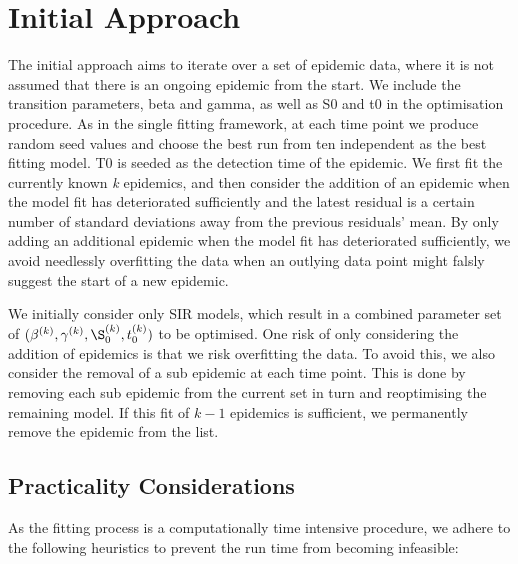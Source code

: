 \section{Initial Approach}
The initial approach aims to iterate over a set of epidemic data,
where it is not assumed that there is an ongoing epidemic from the
start. We include the transition parameters, beta and gamma, as well
as S0 and t0 in the optimisation procedure. As in the single fitting
framework, at each time point we produce random seed values and choose
the best run from ten independent as the best fitting model. T0 is
seeded as the detection time of the epidemic. We first fit the
currently known \emph{k} epidemics, and then consider the addition of
an epidemic when the model fit has deteriorated sufficiently and
the latest residual is a certain number of standard deviations away
from the previous residuals' mean. By only adding an additional
epidemic when the model fit has deteriorated sufficiently, we avoid
needlessly overfitting the data when an outlying data point might
falsly suggest the start of a new epidemic.

We initially consider only SIR models, which result in a combined
parameter set of $(\beta^{(k)},\gamma^{(k)},\S_{0}^{(k)},t_0^{(k)})$ to
be optimised. One risk of only considering the addition of epidemics
is that we risk overfitting the data. To avoid this, we also consider the removal of a
sub epidemic at each time point. This is done by removing each sub
epidemic from the current set in turn and reoptimising the remaining
model. If this fit of $k-1$ epidemics is sufficient, we
permanently remove the epidemic from the list.

\subsection{Practicality Considerations}
As the fitting process is a computationally time intensive procedure,
we adhere to the following heuristics to prevent the run time from
becoming infeasible:


